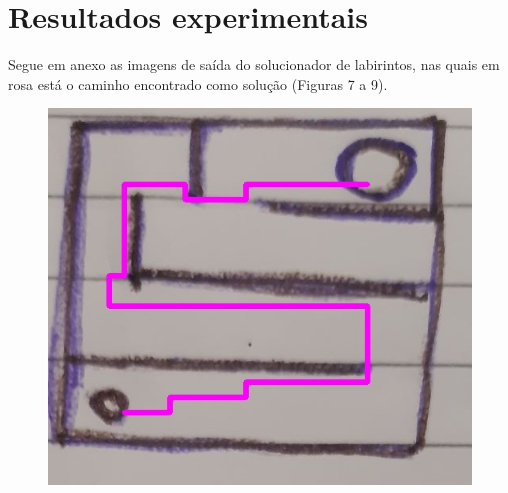 \documentclass[conference]{IEEEtran}
\begin{document}
\section*{Resultados experimentais}
Segue em anexo as imagens de saída do solucionador de labirintos, nas quais em rosa está o caminho encontrado como solução (Figuras 7 a 9).
\begin{figure}[h!]
   \centering
    {\includegraphics[scale=0.25]{solutioneasy.jpg}
    \label{fig:solutioneasy}
    \caption{}
    }
\end{figure}
\end{document}
